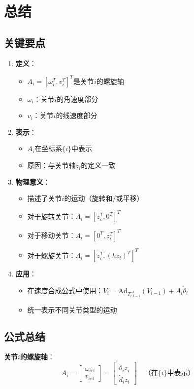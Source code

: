 \documentclass[12pt,a4paper]{article}
\begin{document}
\section{总结}

\subsection{关键要点}

\begin{enumerate}
\item \textbf{定义}：
\begin{itemize}
\item $A_i = [\omega_i^T, v_i^T]^T$是关节$i$的螺旋轴
\item $\omega_i$：关节$i$的角速度部分
\item $v_i$：关节$i$的线速度部分
\end{itemize}

\item \textbf{表示}：
\begin{itemize}
\item $A_i$在坐标系$\{i\}$中表示
\item 原因：与关节轴$z_i$的定义一致
\end{itemize}

\item \textbf{物理意义}：
\begin{itemize}
\item 描述了关节$i$的运动（旋转和/或平移）
\item 对于旋转关节：$A_i = [z_i^T, 0^T]^T$
\item 对于移动关节：$A_i = [0^T, z_i^T]^T$
\item 对于螺旋关节：$A_i = [z_i^T, (h z_i)^T]^T$
\end{itemize}

\item \textbf{应用}：
\begin{itemize}
\item 在速度合成公式中使用：$V_i = \text{Ad}_{T_{i,i-1}^{-1}}(V_{i-1}) + A_i \dot{\theta}_i$
\item 统一表示不同关节类型的运动
\end{itemize}
\end{enumerate}

\subsection{公式总结}

\textbf{关节$i$的螺旋轴}：
\begin{equation}
A_i = \begin{bmatrix} \omega_{\text{rel}} \\ v_{\text{rel}} \end{bmatrix} = \begin{bmatrix} \dot{\theta}_i z_i \\ \dot{d}_i z_i \end{bmatrix} \quad \text{（在$\{i\}$中表示）}
\end{equation}
\end{document}

